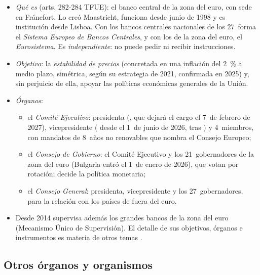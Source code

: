 \documentclass[11pt]{article}
\begin{document}
\begin{itemize}
\item \emph{Qué es} (arts. 282-284 TFUE): el banco central de la zona del euro, con sede en Fráncfort. Lo creó Maastricht, funciona desde junio de 1998 y es institución desde Lisboa. Con los bancos centrales nacionales de los 27~forma el \emph{Sistema Europeo de Bancos Centrales}, y con los de la zona del euro, el \emph{Eurosistema}. Es \emph{independiente}: no puede pedir ni recibir instrucciones.
\item \emph{Objetivo}: la \emph{estabilidad de precios} (concretada en una inflación del 2~\% a medio plazo, simétrica, según su estrategia de 2021, confirmada en 2025) y, sin perjuicio de ella, apoyar las políticas económicas generales de la Unión.
\item \emph{Órganos}:
  \begin{itemize}
  \item el \emph{Comité Ejecutivo}: presidenta (, que dejará el cargo el 7~de febrero de 2027), vicepresidente ( desde el 1~de junio de 2026, tras )\nocite{HNB2026Vujcic} y 4~miembros, con mandatos de 8~años no renovables que nombra el Consejo Europeo;
  \item el \emph{Consejo de Gobierno}: el Comité Ejecutivo y los 21~gobernadores de la zona del euro (Bulgaria entró el 1~de enero de 2026), que votan por rotación; decide la política monetaria;
  \item el \emph{Consejo General}: presidenta, vicepresidente y los 27~gobernadores, para la relación con los países de fuera del euro.
  \end{itemize}
\item Desde 2014 supervisa además los grandes bancos de la zona del euro (Mecanismo Único de Supervisión). El detalle de sus objetivos, órganos e instrumentos es materia de otros temas  .
\end{itemize}

\subsection{Otros órganos y organismos}\label{sec:otros}
\end{document}
